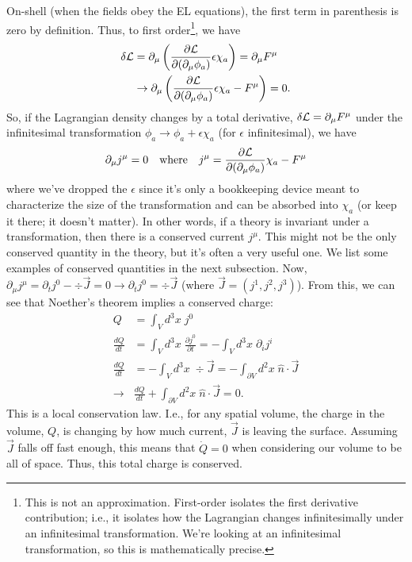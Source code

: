 On-shell (when the fields obey the EL equations), the first term in parenthesis is zero by definition. Thus, to first order\footnote{This is not an approximation. First-order isolates the first derivative contribution; i.e., it isolates how the Lagrangian changes infinitesimally under an infinitesimal transformation. We're looking at an infinitesimal transformation, so this is mathematically precise.}, we have
\begin{align*}
    \delta\mathcal{L} &= \partial_\mu\left(\frac{\partial\mathcal{L}}{\partial(\partial_\mu\phi_a)}\epsilon\chi_a\right) = \partial_\mu F^\mu\\
    &\rightarrow \partial_\mu\left(\frac{\partial\mathcal{L}}{\partial(\partial_\mu\phi_a)}\epsilon\chi_a-F^\mu\right) = 0.
\end{align*}
So, if the Lagrangian density changes by a total derivative, $\delta\mathcal{L} = \partial_\mu F^\mu$ under the infinitesimal transformation $\phi_a\rightarrow \phi_a+\epsilon\chi_a$ (for $\epsilon$ infinitesimal), we have
\[
    \partial_\mu j^\mu = 0 \quad\text{where}\quad j^\mu = \frac{\partial\mathcal{L}}{\partial(\partial_\mu\phi_a)}\chi_a - F^\mu 
\]
where we've dropped the $\epsilon$ since it's only a bookkeeping device meant to characterize the size of the transformation and can be absorbed into $\chi_a$ (or keep it there; it doesn't matter). In other words, if a theory is invariant under a transformation, then there is a conserved current $j^\mu$. This might not be the only conserved quantity in the theory, but it's often a very useful one. We list some examples of conserved quantities in the next subsection. Now, $\partial_\mu j^\mu = \partial_t j^0 - \div{\vec{J}}=0\rightarrow \partial_t j^0=\div{\vec{J}}$ (where $\vec{J}=(j^1,j^2,j^3)$). From this, we can see that Noether's theorem implies a conserved charge:
\begin{align*}
    Q &= \int_{V} d^3x\; j^0 \\
    \frac{dQ}{dt} &= \int_{V}d^3x\;\frac{\partial j^0}{\partial t} = -\int_{V}d^3x\;\partial_i j^i\\
    \frac{dQ}{dt}&=-\int_{V}d^3x\; \div{\vec{J}} = -\int_{\partial V}d^2x\;\hat{n}\cdot \vec{J}\\
    \rightarrow&\frac{dQ}{dt}+\int_{\partial V}d^2x\;\hat{n}\cdot\vec{J}=0.
\end{align*}
This is a local conservation law. I.e., for any spatial volume, the charge in the volume, $Q$, is changing by how much current, $\vec{J}$ is leaving the surface. Assuming $\vec{J}$ falls off fast enough, this means that $\dot{Q}=0$ when considering our volume to be all of space. Thus, this total charge is conserved.

